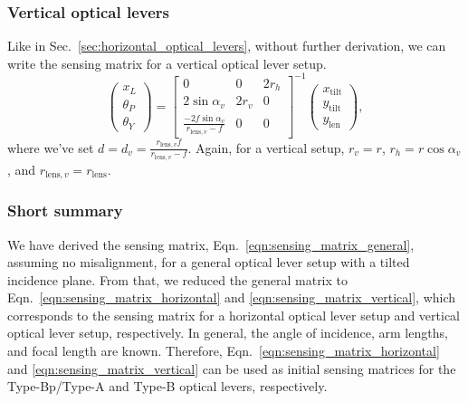 \subsubsection{Vertical optical levers}
Like in Sec.~\ref{sec:horizontal_optical_levers}, without further derivation, we can write the sensing matrix for a vertical optical lever setup.
\begin{equation}
	\begin{pmatrix}
		x_L\\
		\theta_P\\
		\theta_Y
	\end{pmatrix}
	=
	\begin{bmatrix}
		0 & 0 & 2r_h\\
		2\sin\alpha_v & 2r_v & 0\\
		\frac{-2f\sin\alpha_v}{r_{\mathrm{lens},v}-f} & 0 & 0
	\end{bmatrix}^{-1}
	\begin{pmatrix}
		x_\mathrm{tilt}\\
		y_\mathrm{tilt}\\
		y_\mathrm{len}
	\end{pmatrix},
	\label{eqn:sensing_matrix_vertical}
\end{equation}
where we've set $d=d_v=\frac{r_{\mathrm{lens},v}f}{r_{\mathrm{lens},v}-f}$.
Again, for a vertical setup, $r_v=r$, $r_h=r\cos\alpha_v$, and $r_{\mathrm{lens},v}=r_\mathrm{lens}$.

\subsubsection{Short summary}
We have derived the sensing matrix, Eqn.~\eqref{eqn:sensing_matrix_general}, assuming no misalignment, for a general optical lever setup with a tilted incidence plane.
From that, we reduced the general matrix to Eqn.~\eqref{eqn:sensing_matrix_horizontal} and \eqref{eqn:sensing_matrix_vertical}, which corresponds to the sensing matrix for a horizontal optical lever setup and vertical optical lever setup, respectively.
In general, the angle of incidence, arm lengths, and focal length are known.
Therefore, Eqn.~\eqref{eqn:sensing_matrix_horizontal} and \eqref{eqn:sensing_matrix_vertical} can be used as initial sensing matrices for the Type-Bp/Type-A and Type-B optical levers, respectively.


